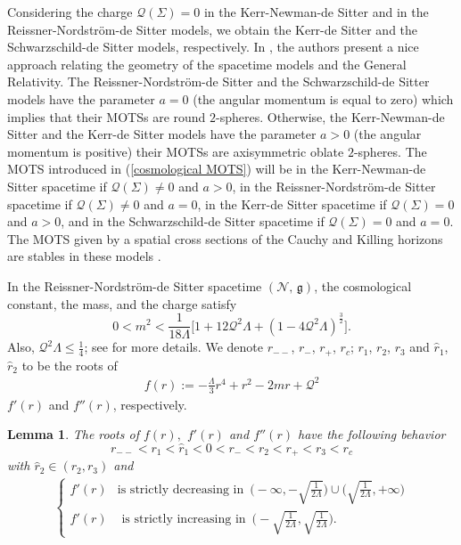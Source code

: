 \documentclass[a4paper, 11pt, reqno]{amsart}
\newtheorem{lemma}[theo]{Lemma}
\begin{document}
Considering the charge $\mathcal{Q}(\Sigma)=0$ in the Kerr-Newman-de Sitter and in the Reissner-Nordström-de Sitter models, we obtain the Kerr-de Sitter and the Schwarzschild-de Sitter models, respectively. In \cite{BLP, LP}, the authors present a nice approach relating the geometry of the spacetime models and  the General Relativity. The Reissner-Nordström-de Sitter and the Schwarzschild-de Sitter models have the parameter $a=0$ (the angular momentum is equal to zero) which implies that their MOTSs are round $2$-spheres. Otherwise, the Kerr-Newman-de Sitter and the Kerr-de Sitter models have the parameter $a>0$ (the angular momentum is positive) their MOTSs are axisymmetric oblate $2$-spheres. The MOTS introduced in (\ref{cosmological MOTS}) will be in the Kerr-Newman-de Sitter spacetime if $\mathcal{Q}(\Sigma)\neq 0$ and $a>0$, in the Reissner-Nordström-de Sitter spacetime if $\mathcal{Q}(\Sigma)\neq 0$ and $a=0$, in the Kerr-de Sitter spacetime if $\mathcal{Q}(\Sigma)= 0$ and $a>0$, and in the Schwarzschild-de Sitter spacetime if $\mathcal{Q}(\Sigma)= 0$ and $a=0$. The MOTS given by a spatial cross sections of the Cauchy and Killing horizons are stables in these models \cite{BKO, CLS}.

In the Reissner-Nordström-de Sitter spacetime $(\mathcal{N},\,\mathfrak{g})$, the cosmological constant, the mass, and the charge satisfy
\begin{equation}\label{Mass-inequality}
   0< m^2<\frac{1}{18\Lambda}\Big[1+12\mathcal{Q}^2\Lambda+(1-4\mathcal{Q}^2\Lambda)^{\frac{3}{2}}\Big].
\end{equation}
Also, $\mathcal{Q}^2\Lambda\leq\frac{1}{4}$; see \cite{B,CLS} for more details. We denote $r_{--}$, $r_{-}$, $r_+$, $r_c$; $r_1$, $r_2$, $r_3$ and $\hat{r}_1$, $\hat{r}_2$ to be the roots of 
\begin{eqnarray*}
    f(r):=-\frac{\Lambda}{3}r^4+r^2-2mr+\mathcal{Q}^2
\end{eqnarray*}
$f'(r)$ and $f''(r)$, respectively. 
\begin{lemma}\label{lemma}
The roots of $f(r),$ $f'(r)$ and $f''(r)$ have the following behavior
$$r_{--}<r_1<\hat{r}_1<0<r_{-}<r_2<r_{+}<r_3<r_{c}$$
with $\hat{r}_2\in (r_2,r_3)$ and
\begin{eqnarray*}
\left\{\begin{array}{rc}
f'(r) &\mbox{is strictly decreasing in}\,\,\, \Big(-\infty,-\sqrt{\frac{1}{2\Lambda}}\Big)\cup\Big(\sqrt{\frac{1}{2\Lambda}},+\infty\Big)\\
f'(r)  &\mbox{ is strictly increasing in}\,\,\, \Big(-\sqrt{\frac{1}{2\Lambda}},\sqrt{\frac{1}{2\Lambda}}\Big).
\end{array}\right.
\end{eqnarray*}
\end{lemma}
\end{document}
